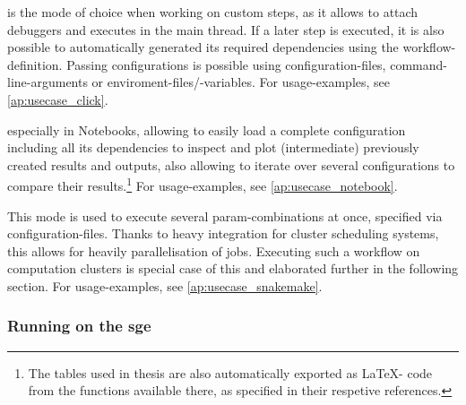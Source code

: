 \begin{description}[style=unboxed]
	\item[Running individual Steps per \gls{cli}] is the mode of choice when working on custom steps, as it allows to attach debuggers and executes in the main thread. If a later step is executed, it is also possible to automatically generated its required dependencies using the workflow-definition. Passing configurations is possible using configuration-files, command-line-arguments or enviroment-files/-variables. For usage-examples, see \autoref{ap:usecase_click}.
	\item[Loading existing Configurations for inspection] especially in Notebooks, allowing to easily load a complete configuration including all its dependencies to inspect and plot (intermediate) previously created results and outputs, also allowing to iterate over several configurations to compare their results.\footnote{The tables used in thesis are also automatically exported as \LaTeX- code from the functions available there, as specified in their respetive references.} For usage-examples, see \autoref{ap:usecase_notebook}.
	\item[Running/Scheduling a Workflow] This mode is used to execute several \gls{param}-combinations at once, specified via configuration-files. Thanks to heavy integration for cluster scheduling systems, this allows for heavily parallelisation of jobs. Executing such a workflow on computation clusters is special case of this and elaborated further in the following section. For usage-examples, see \autoref{ap:usecase_snakemake}.
\end{description}


\subsubsection*{Running on the \gls{sge}}

